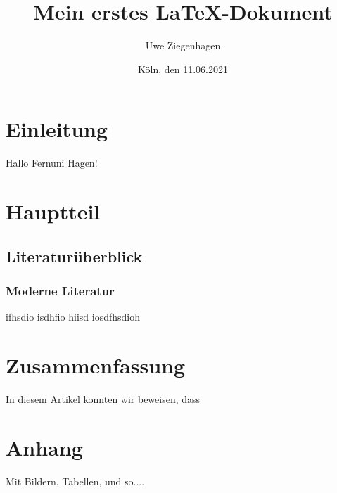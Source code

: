\documentclass[ngerman,12pt]{scrartcl}
\title{Mein erstes \LaTeX-Dokument}
\author{Uwe Ziegenhagen}
\date{Köln, den 11.06.2021}
\begin{document}
\maketitle

\tableofcontents

\section{Einleitung}

Hallo Fernuni Hagen! 

\section{Hauptteil}
\subsection{Literaturüberblick}
\subsubsection{Moderne Literatur}


ifhsdio isdhfio hiisd iosdfhsdioh

\section{Zusammenfassung}

In diesem Artikel konnten wir beweisen, dass

\section{Anhang}

Mit Bildern, Tabellen, und so....
\end{document}

